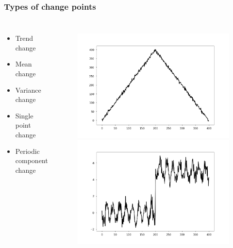 \documentclass[intlimits, 9pt, unicode]{beamer}
\begin{document}
\begin{frame}
    \frametitle{Types of change points}


  \begin{columns}[T,onlytextwidth]
    \begin{itemize}
    	\item Trend change
	\item Mean change
	\item Variance change
	\item Single point change
	\item Periodic component change
    \end{itemize}


	\begin{figure}
		\includegraphics[scale=0.07]{images/examples_trend}
		\includegraphics[scale=0.07]{images/examples_mean}

\end{figure}
\end{columns}
\end{frame}
\end{document}
